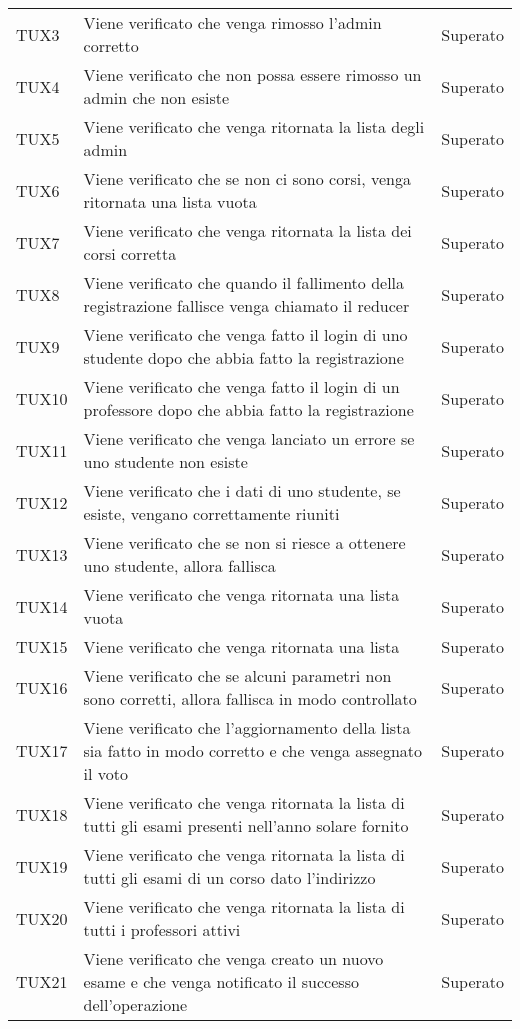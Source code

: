 \documentclass[PianoDiQualifica.tex]{subfiles}
\begin{document}
\begin{longtable}[H]{P{2cm}P{8.5cm}P{3cm}}
	TUX3 & Viene verificato che venga rimosso l'admin corretto & Superato \\
	TUX4 & Viene verificato che non possa essere rimosso un admin che non esiste & Superato \\
	TUX5 & Viene verificato che venga ritornata la lista degli admin & Superato \\
	TUX6 & Viene verificato che se non ci sono corsi, venga ritornata una lista vuota & Superato \\
	TUX7 & Viene verificato che venga ritornata la lista dei corsi corretta & Superato \\
	TUX8 & Viene verificato che quando il fallimento della registrazione fallisce venga chiamato il reducer & Superato \\
	TUX9 & Viene verificato che venga fatto il login di uno studente dopo che abbia fatto la registrazione & Superato \\
	TUX10 & Viene verificato che venga fatto il login di un professore dopo che abbia fatto la registrazione & Superato \\
	TUX11 & Viene verificato che venga lanciato un errore se uno studente non esiste & Superato \\
	TUX12 & Viene verificato che i dati di uno studente, se esiste, vengano correttamente riuniti & Superato \\
	TUX13 & Viene verificato che se non si riesce a ottenere uno studente, allora fallisca & Superato \\
	TUX14 & Viene verificato che venga ritornata una lista vuota & Superato \\
	TUX15 & Viene verificato che venga ritornata una lista & Superato \\
	TUX16 & Viene verificato che se alcuni parametri non sono corretti, allora fallisca in modo controllato & Superato \\
	TUX17 & Viene verificato che l'aggiornamento della lista sia fatto in modo corretto e che venga assegnato il voto & Superato \\
	TUX18 & Viene verificato che venga ritornata la lista di tutti gli esami presenti nell'anno solare fornito & Superato \\
	TUX19 & Viene verificato che venga ritornata la lista di tutti gli esami di un corso dato l'indirizzo & Superato \\
	TUX20 & Viene verificato che venga ritornata la lista di tutti i professori attivi & Superato \\
	TUX21 & Viene verificato che venga creato un nuovo esame e che venga notificato il successo dell'operazione & Superato \\

\end{longtable}
\end{document}
